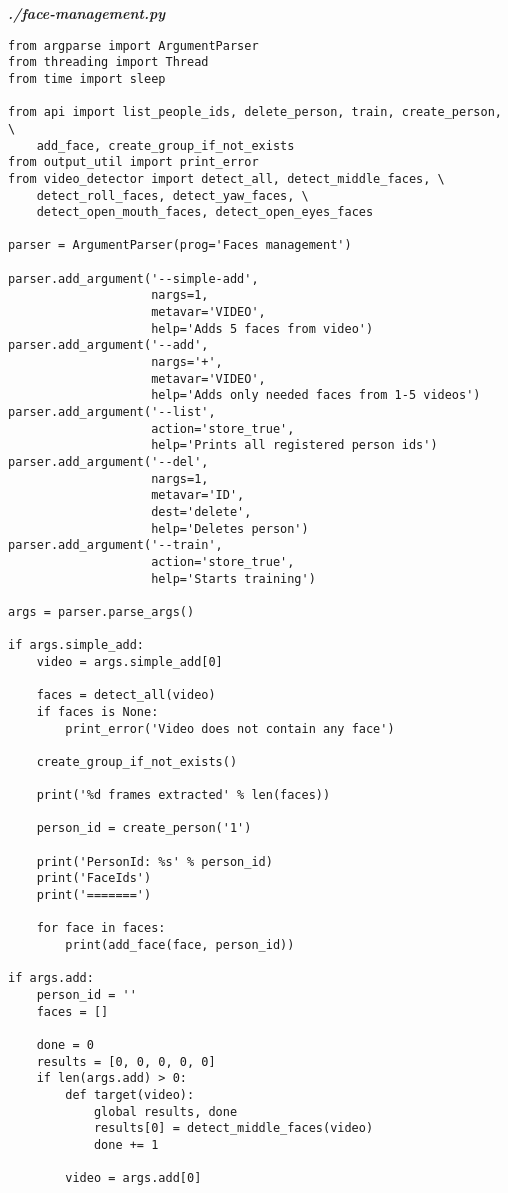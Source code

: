 \textit{\textbf{./face-management.py}}
\begin{verbatim}
from argparse import ArgumentParser
from threading import Thread
from time import sleep

from api import list_people_ids, delete_person, train, create_person, \ 
    add_face, create_group_if_not_exists
from output_util import print_error
from video_detector import detect_all, detect_middle_faces, \
    detect_roll_faces, detect_yaw_faces, \
    detect_open_mouth_faces, detect_open_eyes_faces

parser = ArgumentParser(prog='Faces management')

parser.add_argument('--simple-add',
                    nargs=1,
                    metavar='VIDEO',
                    help='Adds 5 faces from video')
parser.add_argument('--add',
                    nargs='+',
                    metavar='VIDEO',
                    help='Adds only needed faces from 1-5 videos')
parser.add_argument('--list',
                    action='store_true',
                    help='Prints all registered person ids')
parser.add_argument('--del',
                    nargs=1,
                    metavar='ID',
                    dest='delete',
                    help='Deletes person')
parser.add_argument('--train',
                    action='store_true',
                    help='Starts training')

args = parser.parse_args()

if args.simple_add:
    video = args.simple_add[0]

    faces = detect_all(video)
    if faces is None:
        print_error('Video does not contain any face')

    create_group_if_not_exists()

    print('%d frames extracted' % len(faces))

    person_id = create_person('1')

    print('PersonId: %s' % person_id)
    print('FaceIds')
    print('=======')

    for face in faces:
        print(add_face(face, person_id))

if args.add:
    person_id = ''
    faces = []

    done = 0
    results = [0, 0, 0, 0, 0]
    if len(args.add) > 0:
        def target(video):
            global results, done
            results[0] = detect_middle_faces(video)
            done += 1

        video = args.add[0]


\end{verbatim}
